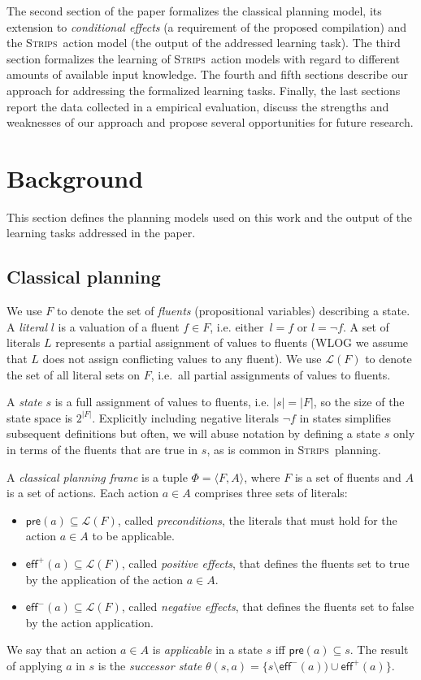\documentclass[letterpaper]{article} %
\newcommand{\tup}[1]{{\langle #1 \rangle}}
\newcommand{\pre}{\mathsf{pre}}     %
\newcommand{\eff}{\mathsf{eff}}     %
\newcommand{\strips}{\textsc{Strips}}     %
\begin{document}
The second section of the paper formalizes the classical planning model, its extension to {\em conditional effects} (a requirement of the proposed compilation) and the \strips\ action model (the output of the addressed learning task). The third section formalizes the learning of \strips\ action models with regard to different amounts of available input knowledge. The fourth and fifth sections describe our approach for addressing the formalized learning tasks. Finally, the last sections report the data collected in a empirical evaluation, discuss the strengths and weaknesses of our approach and propose several opportunities for future research.


\section{Background}
This section defines the planning models used on this work and the output of the learning tasks addressed in the paper.

\subsection{Classical planning}
We use $F$ to denote the set of {\em fluents} (propositional variables) describing a state. A {\em literal} $l$ is a valuation of a fluent $f\in F$, i.e. either~$l=f$ or $l=\neg f$. A set of literals $L$ represents a partial assignment of values to fluents (WLOG we assume that $L$ does not assign conflicting values to any fluent). We use $\mathcal{L}(F)$ to denote the set of all literal sets on $F$, i.e.~all partial assignments of values to fluents.

A {\em state} $s$ is a full assignment of values to fluents, i.e. $|s|=|F|$, so the size of the state space is $2^{|F|}$. Explicitly including negative literals $\neg f$ in states simplifies subsequent definitions but often, we will abuse notation by defining a state $s$ only in terms of the fluents that are true in $s$, as is common in \strips\ planning.

A {\em classical planning frame} is a tuple $\Phi=\tup{F,A}$, where $F$ is a set of fluents and $A$ is a set of actions. Each action $a\in A$ comprises three sets of literals:
\begin{itemize}
\item $\pre(a)\subseteq\mathcal{L}(F)$, called {\em preconditions}, the literals that must hold for the action $a\in A$ to be applicable.
\item $\eff^+(a)\subseteq\mathcal{L}(F)$, called {\em positive effects}, that defines the fluents set to true by the application of the action $a\in A$.
\item $\eff^-(a)\subseteq\mathcal{L}(F)$, called {\em negative effects}, that defines the fluents set to false by the action application.
\end{itemize}
We say that an action $a\in A$ is {\em applicable} in a state $s$ iff $\pre(a)\subseteq s$. The result of applying $a$ in $s$ is the {\em successor state} $\theta(s,a)=\{s\setminus\eff^-(a))\cup\eff^+(a)\}$.
\end{document}
